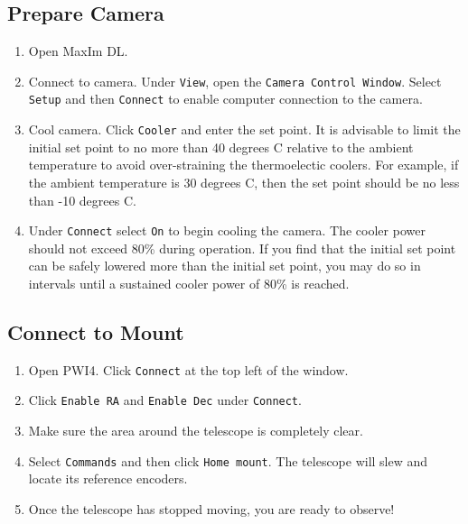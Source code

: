 \documentclass{article}
\begin{document}
		\subsection{Prepare Camera}
		
			\begin{enumerate}
				
				\item Open MaxIm DL.
							
				\item Connect to camera. Under \texttt{View}, open the \texttt{Camera Control Window}. Select \texttt{Setup} and then \texttt{Connect} to enable computer connection to the camera.
				
				\item Cool camera. Click \texttt{Cooler} and enter the set point. It is advisable to limit the initial set point to no more than 40 degrees C relative to the ambient temperature to avoid over-straining the thermoelectic coolers. For example, if the ambient temperature is 30 degrees C, then the set point should be no less than -10 degrees C.
				
				\item Under \texttt{Connect} select \texttt{On} to begin cooling the camera. The cooler power should not exceed 80\% during operation. If you find that the initial set point can be safely lowered more than the initial set point, you may do so in intervals until a sustained cooler power of 80\% is reached.
				
			\end{enumerate}
		
		\subsection{Connect to Mount}
		
			\begin{enumerate}
								
				\item Open PWI4. Click \texttt{Connect} at the top left of the window.
				
				\item Click \texttt{Enable RA} and \texttt{Enable Dec} under \texttt{Connect}.
	
				\item Make sure the area around the telescope is completely clear.
	
				\item Select \texttt{Commands} and then click \texttt{Home mount}. The telescope will slew and locate its reference encoders.
				
				\item Once the telescope has stopped moving, you are ready to observe!
							
			\end{enumerate}
		
\end{document}
